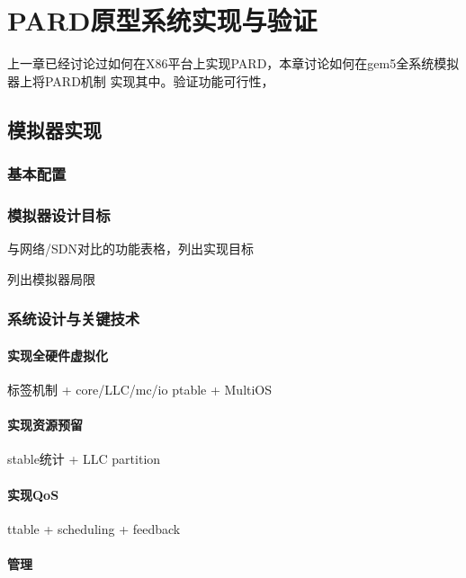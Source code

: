 

\chapter{PARD原型系统实现与验证}
\label{chap:impl}

上一章已经讨论过如何在X86平台上实现PARD，本章讨论如何在gem5全系统模拟器上将PARD机制
实现其中。验证功能可行性，

\section{模拟器实现}
\subsection{基本配置}

\subsection{模拟器设计目标}

与网络/SDN对比的功能表格，列出实现目标

列出模拟器局限

\subsection{系统设计与关键技术}

\subsubsection{实现全硬件虚拟化}

标签机制 + core/LLC/mc/io
ptable + MultiOS

\subsubsection{实现资源预留}

stable统计 + LLC partition

\subsubsection{实现QoS}

ttable + scheduling + feedback

\subsubsection{管理}

